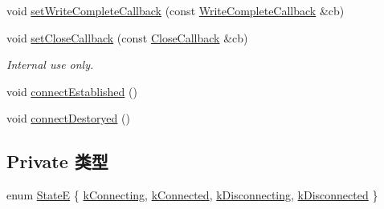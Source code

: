 \begin{DoxyCompactItemize}
\item 
void \hyperlink{classmuduo_1_1TcpConnection_a94b31be320453fc8aeae81b25934b43f}{set\+Write\+Complete\+Callback} (const \hyperlink{namespacemuduo_a605eda27d048a69607942b95735d7087}{Write\+Complete\+Callback} \&cb)
\item 
void \hyperlink{classmuduo_1_1TcpConnection_acb32ba0eda160676b4fc98d756ee3515}{set\+Close\+Callback} (const \hyperlink{namespacemuduo_ab2469aa3fe08794ee43a3d8f69bff30f}{Close\+Callback} \&cb)
\begin{DoxyCompactList}\small\item\em Internal use only. \end{DoxyCompactList}\item 
void \hyperlink{classmuduo_1_1TcpConnection_a2e1f9742dac98a0c3e5a5509920934ae}{connect\+Established} ()
\item 
void \hyperlink{classmuduo_1_1TcpConnection_afff2c1576d605dda12f87d2b32d5c1a2}{connect\+Destoryed} ()
\end{DoxyCompactItemize}
\subsection*{Private 类型}
\begin{DoxyCompactItemize}
\item 
enum \hyperlink{classmuduo_1_1TcpConnection_a8cf72f776f4277c8138a1beaf5185325}{StateE} \{ \hyperlink{classmuduo_1_1TcpConnection_a8cf72f776f4277c8138a1beaf5185325adddfdd7363e62a5f443716e15d0bc1ff}{k\+Connecting}, 
\hyperlink{classmuduo_1_1TcpConnection_a8cf72f776f4277c8138a1beaf5185325acb7fe9fd788a796e7d827c0303dcd405}{k\+Connected}, 
\hyperlink{classmuduo_1_1TcpConnection_a8cf72f776f4277c8138a1beaf5185325a8fd5c7ab5a7aa063f1072c29b949f558}{k\+Disconnecting}, 
\hyperlink{classmuduo_1_1TcpConnection_a8cf72f776f4277c8138a1beaf5185325a5f4e8711c6f39bc392c23dfacf44c953}{k\+Disconnected}
 \}
\end{DoxyCompactItemize}
